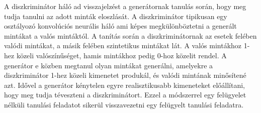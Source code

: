 A diszkriminátor háló ad visszajelzést a generátornak tanulás során, hogy meg tudja tanulni az adott minták eloszlását. A diszkriminátor tipikusan egy osztályozó konvolúciós neurális háló ami képes megkülönböztetni a generált mintákat a valós mintáktól. A tanítás során a diszkriminátornak az esetek felében valódi mintákat, a másik felében szintetikus mintákat lát. A valós mintákhoz 1-hez közeli valószínűséget, hamis mintákhoz pedig 0-hoz közelit rendel. A generátor e közben megtanul olyan mintákat generálni, amelyekre a diszkriminátor 1-hez közeli kimenetet produkál, és valódi mintának minősítené azt. Idővel a generátor kénytelen egyre realisztikusabb kimeneteket előállítani, hogy meg tudja téveszteni a diszkriminátort. Ezzel a módszerrel egy felügyelet nélküli tanulási feladatot sikerül visszavezetni egy felügyelt tanulási feladatra.



